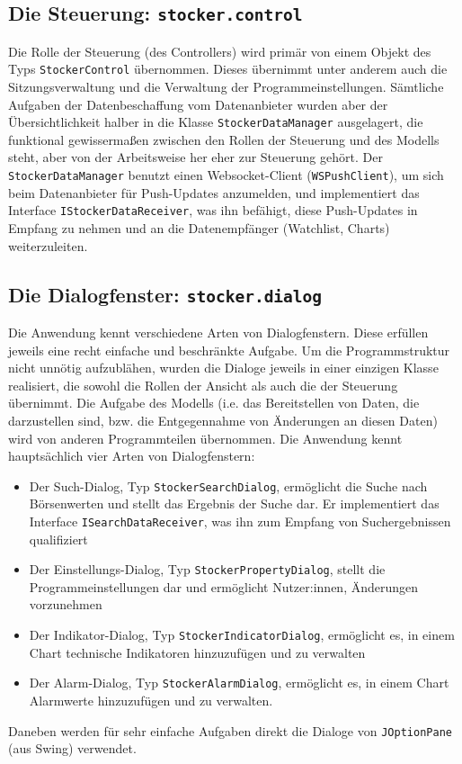 \documentclass[fontsize=12pt, paper=a4, pagesize=auto, twoside=false, DIV=11, draft=false]{scrartcl}
\begin{document}
\subsection{Die Steuerung: \texttt{stocker.control}}
Die Rolle der Steuerung (des Controllers) wird primär von einem Objekt des Typs \texttt{StockerControl} übernommen. Dieses übernimmt unter anderem auch die Sitzungsverwaltung und die Verwaltung der Programmeinstellungen. Sämtliche Aufgaben der Datenbeschaffung vom Datenanbieter wurden aber der Übersichtlichkeit halber in die Klasse \texttt{StockerDataManager} ausgelagert, die funktional gewissermaßen zwischen den Rollen der Steuerung und des Modells steht, aber von der Arbeitsweise her eher zur Steuerung gehört. Der \texttt{StockerDataManager} benutzt einen Websocket-Client (\texttt{WSPushClient}), um sich beim Datenanbieter für Push-Updates anzumelden, und implementiert das Interface \texttt{IStockerDataReceiver}, was ihn befähigt, diese Push-Updates in Empfang zu nehmen und an die Datenempfänger (Watchlist, Charts) weiterzuleiten.

\subsection{Die Dialogfenster: \texttt{stocker.dialog}}
Die Anwendung kennt verschiedene Arten von Dialogfenstern. Diese erfüllen jeweils eine recht einfache und beschränkte Aufgabe. Um die Programmstruktur nicht unnötig aufzublähen, wurden die Dialoge jeweils in einer einzigen Klasse realisiert, die sowohl die Rollen der Ansicht als auch die der Steuerung übernimmt. Die Aufgabe des Modells (i.e. das Bereitstellen von Daten, die darzustellen sind, bzw. die Entgegennahme von Änderungen an diesen Daten) wird von anderen Programmteilen übernommen. Die Anwendung kennt hauptsächlich vier Arten von Dialogfenstern:
\begin{itemize}
\item Der Such-Dialog, Typ \texttt{StockerSearchDialog}, ermöglicht die Suche nach Börsenwerten und stellt das Ergebnis der Suche dar. Er implementiert das Interface \texttt{ISearchDataReceiver}, was ihn zum Empfang von Suchergebnissen qualifiziert
\item Der Einstellungs-Dialog, Typ \texttt{StockerPropertyDialog}, stellt die Programmeinstellungen dar und ermöglicht Nutzer:innen, Änderungen vorzunehmen
\item Der Indikator-Dialog, Typ \texttt{StockerIndicatorDialog}, ermöglicht es, in einem Chart technische Indikatoren hinzuzufügen und zu verwalten
\item Der Alarm-Dialog, Typ \texttt{StockerAlarmDialog}, ermöglicht es, in einem Chart Alarmwerte hinzuzufügen und zu verwalten.
\end{itemize}
Daneben werden für sehr einfache Aufgaben direkt die Dialoge von \texttt{JOption\-Pane} (aus Swing) verwendet. 
\end{document}
